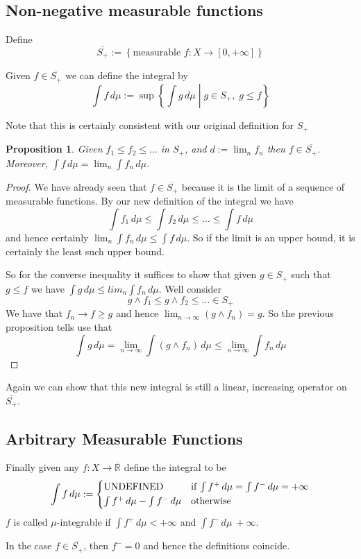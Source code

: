 \documentclass[11pt]{article}
\newcommand{\defeq}{:=}
\newcommand{\relmiddle}[1]{\mathrel{}\middle#1\mathrel{}}
\newcommand{\rmv}{\relmiddle|}
\newcommand{\dm}{\ensuremath{\,d\mu}}
\newcommand{\R}{\mathbb{R}}
\newcommand{\Rb}{\overline{\R}}
\newenvironment{defin}
	{\begin{mdframed}[backgroundcolor=white, roundcorner=5pt, linewidth=1pt]}
	{\end{mdframed}}
\newcommand{\mdf}[1]{{\color{red} #1}}
\newtheorem{prop}[theorem]{Proposition}
\begin{document}
\subsection{Non-negative measurable functions}
Define
\[
	\overline{S_+}\defeq\left\{\text{measurable }f:X\to[0, +\infty]\right\}
\]
\begin{defin}
Given $f\in\overline{S_+}$ we can define the \mdf{integral} by
\[
	\int f \dm\defeq \sup\left\{\int g \dm \rmv g\in S_+, \; g\leq f\right\}
\]
\end{defin}
Note that this is certainly consistent with our original definition for $S_+$
\begin{prop}
	Given $f_1 \leq f_2 \leq \dots$ in $S_+$, and $d\defeq\lim_n f_n$ then $f\in \overline{S_+}$.
	Moreover, $\int f \dm = \lim_n \int f_n \dm$.
\end{prop}
\begin{proof}
We have already seen that $f\in\overline{S_+}$ because it is the limit of a sequence of measurable functions.
By our new definition of the integral we have
\[
\int f_1 \dm \leq \int f_2 \dm \leq \dots \leq \int f \dm
\]
and hence certainly $\lim_n \int f_n \dm \leq \int f \dm$.
So if the limit is an upper bound, it is certainly the least such upper bound.

So for the converse inequality it suffices to show that given $g\in S_+$ such that $g\leq f$ we have $\int g \dm \leq lim_n \int f_n \dm$.
Well consider 
\[
g\wedge f_1 \leq g\wedge f_2 \leq \dots \in S_+
\]
We have that $f_n\to f\geq g$ and hence $\lim_{n\to\infty}(g\wedge f_n)= g$.
So the previous proposition tells use that
\[
	\int g \dm = \lim_{n\to\infty}\int (g\wedge f_n) \dm \leq \lim_{n\to\infty}\int f_n \dm 
\]
\end{proof}
Again we can show that this new integral is still a linear, increasing operator on $\overline{S_+}$.

\subsection{Arbitrary Measurable Functions}
\begin{defin}
	Finally given any $f:X\to\Rb$ define the \mdf{integral} to be
\[
	\int f\dm\defeq
	\begin{cases*}
		\text{UNDEFINED} & if $\int f^+ \dm = \int f^- \dm = +\infty$\\
		\int f^+ \dm - \int f^- \dm & otherwise
	\end{cases*}
\]
$f$ is called \mdf{$\mu$-integrable} if $\int f^+ \dm < +\infty$ and $\int f^- \dm \ + \infty$.
\end{defin}  
In the case $f\in\overline{S_+}$, then $f^-=0$ and hence the definitions coincide.
\end{document}

